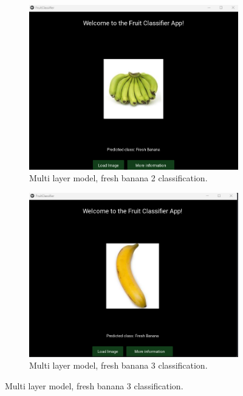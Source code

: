 \documentclass[conference]{IEEEtran}
\begin{document}
\begin{figure}[h]
    \hfill
    \begin{subfigure}[b]{0.48\linewidth}
        \centering
        \includegraphics[width=\linewidth]{Mlayer banana2.png}
        \caption{Multi layer model, fresh banana 2 classification.}
        \label{figFB}
    \end{subfigure}
    \hfill
    \begin{subfigure}[b]{0.48\linewidth}
        \centering
        \includegraphics[width=\linewidth]{Mlayer banana3.png}
        \caption{Multi layer model, fresh banana 3 classification.}
        \label{figFB}
    \end{subfigure}
    \hfill

\end{figure}
\end{document}
